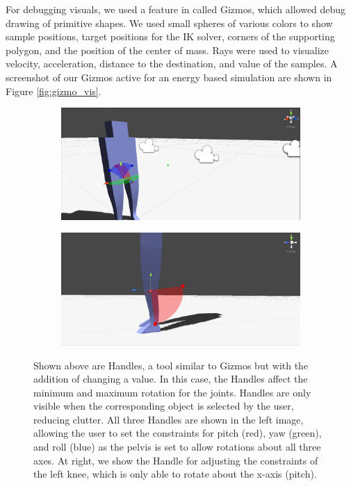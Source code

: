 For debugging visuals, we used a feature in \unity{} called Gizmos, which allowed debug drawing of primitive shapes.  We used small spheres of various colors to show sample positions, target positions for the IK solver, corners of the supporting polygon, and the position of the center of mass.  Rays were used to visualize velocity, acceleration, distance to the destination, and value of the samples.  A screenshot of our Gizmos active for an energy based simulation are shown in Figure \ref{fig:gizmo_vis}.

\begin{figure}[ht]
	\centering
	\begin{subfigure}[b]{0.49\textwidth}
		\includegraphics[width=\textwidth]{images/handles1.png}
	\end{subfigure}
	\begin{subfigure}[b]{0.49\textwidth}
		\includegraphics[width=\textwidth]{images/handles2.png}
	\end{subfigure}
	\caption[Screenshot of Handles used for setting and visualizing joint constraints in \unity{}]{Shown above are Handles, a tool similar to Gizmos but with the addition of changing a value.  In this case, the Handles affect the minimum and maximum rotation for the joints.  Handles are only visible when the corresponding object is selected by the user, reducing clutter.  All three Handles are shown in the left image, allowing the user to set the constraints for pitch (red), yaw (green), and roll (blue) as the pelvis is set to allow rotations about all three axes.  At right, we show the Handle for adjusting the constraints of the left knee, which is only able to rotate about the x-axis (pitch).}
	\label{fig:handle_vis}
\end{figure}

